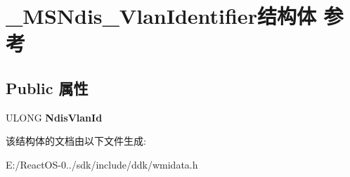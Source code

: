 \hypertarget{struct___m_s_ndis___vlan_identifier}{}\section{\+\_\+\+M\+S\+Ndis\+\_\+\+Vlan\+Identifier结构体 参考}
\label{struct___m_s_ndis___vlan_identifier}
\subsection*{Public 属性}
\begin{DoxyCompactItemize}
\item 
\mbox{\label{struct___m_s_ndis___vlan_identifier_a8796ccaf84a52bc410043ad543898699}} 
U\+L\+O\+NG {\bfseries Ndis\+Vlan\+Id}
\end{DoxyCompactItemize}


该结构体的文档由以下文件生成\+:\begin{DoxyCompactItemize}
\item 
E\+:/\+React\+O\+S-\/0../sdk/include/ddk/wmidata.\+h\end{DoxyCompactItemize}
